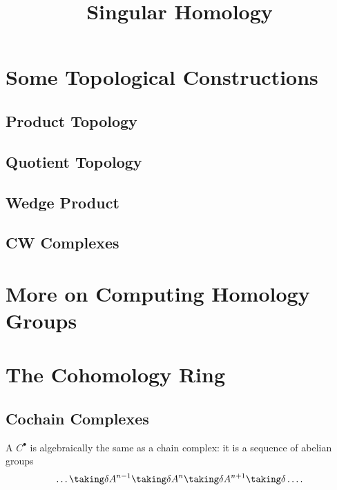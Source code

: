\documentclass[11pt]{scrreprt}
\begin{document}
\title{Singular Homology}
\maketitle

\chapter{Some Topological Constructions}
\section{Product Topology}
\section{Quotient Topology}
\section{Wedge Product}
\section{CW Complexes}

\chapter{More on Computing Homology Groups}
\chapter{The Cohomology Ring}
\section{Cochain Complexes}
A  $C^\bullet$ is algebraically the same as a chain complex:
it is a sequence of abelian groups
\[ \dots \taking\delta A^{n-1} \taking\delta A^n \taking\delta A^{n+1} \taking\delta \dots. \]
\end{document}

